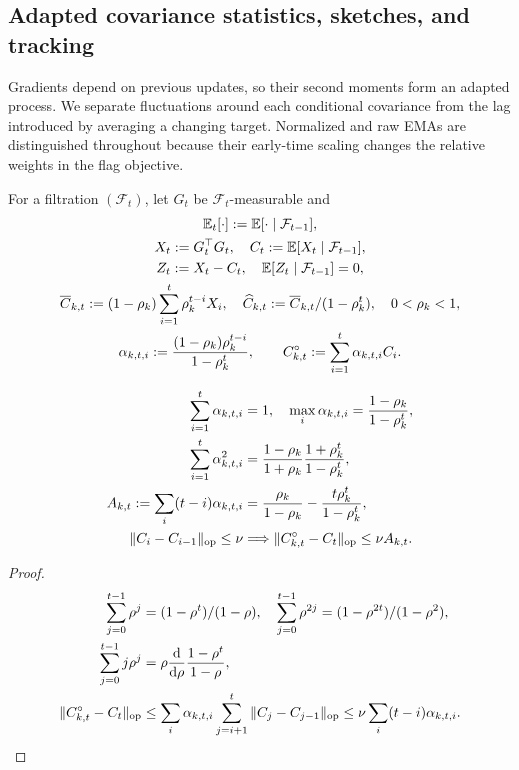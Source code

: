 \subsection{Adapted covariance statistics, sketches, and tracking}
Gradients depend on previous updates, so their second moments form an adapted
process. We separate fluctuations around each conditional covariance from the
lag introduced by averaging a changing target. Normalized and raw EMAs are
distinguished throughout because their early-time scaling changes the relative
weights in the flag objective.

\begin{definition}
For a filtration $(\mathcal F_t)$, let $G_t$ be $\mathcal F_t$-measurable and
\begin{gather}
 \mathbb E_t[\cdot]:=\mathbb E[\cdot\mid\mathcal F_{t-1}],\\
 X_t:=G_t^\top G_t,\quad C_t:=\mathbb E[X_t\mid\mathcal F_{t-1}],\\
 Z_t:=X_t-C_t,\quad\mathbb E[Z_t\mid\mathcal F_{t-1}]=0,\\
 \overline C_{k,t}:=(1-\rho_k)\sum_{i=1}^t\rho_k^{t-i}X_i,\quad
 \widehat C_{k,t}:=\overline C_{k,t}/(1-\rho_k^t),\quad0<\rho_k<1,\\
 \alpha_{k,t,i}:=\frac{(1-\rho_k)\rho_k^{t-i}}{1-\rho_k^t},\qquad
 C^\circ_{k,t}:=\sum_{i=1}^t\alpha_{k,t,i}C_i.
\end{gather}
\end{definition}
\begin{lemma}\label{lem:rigid-ema}
\begin{align}
 \sum_{i=1}^t\alpha_{k,t,i}&=1,\quad
 \max_i\alpha_{k,t,i}=\frac{1-\rho_k}{1-\rho_k^t},\\
 \sum_{i=1}^t\alpha_{k,t,i}^2
 &=\frac{1-\rho_k}{1+\rho_k}\frac{1+\rho_k^t}{1-\rho_k^t},\\
 A_{k,t}:=\sum_i(t-i)\alpha_{k,t,i}
 &=\frac{\rho_k}{1-\rho_k}-\frac{t\rho_k^t}{1-\rho_k^t},\\
 \|C_i-C_{i-1}\|_{\mathrm{op}}\le\nu
 &\Longrightarrow\|C^\circ_{k,t}-C_t\|_{\mathrm{op}}\le\nu A_{k,t}.
\end{align}
\end{lemma}
\begin{proof}
\begin{align}
 \sum_{j=0}^{t-1}\rho^j&=(1-\rho^t)/(1-\rho),\quad
 \sum_{j=0}^{t-1}\rho^{2j}=(1-\rho^{2t})/(1-\rho^2),\\
 \sum_{j=0}^{t-1}j\rho^j
 &=\rho\frac{\mathrm d}{\mathrm d\rho}\frac{1-\rho^t}{1-\rho},\\
 \|C^\circ_{k,t}-C_t\|_{\mathrm{op}}
 &\le\sum_i\alpha_{k,t,i}\sum_{j=i+1}^t\|C_j-C_{j-1}\|_{\mathrm{op}}
 \le\nu\sum_i(t-i)\alpha_{k,t,i}.
\end{align}
\end{proof}
